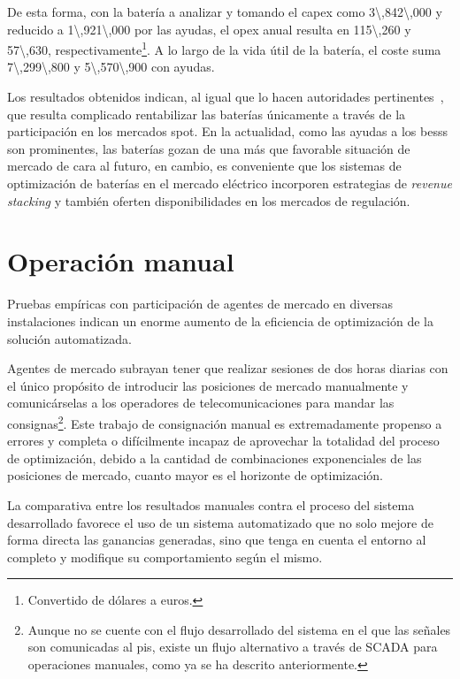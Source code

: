 De esta forma, con la batería a analizar y tomando el \gls{capex} como \SI{3\,842\,000}{\text{\euro}} y reducido a \SI{1\,921\,000}{\text{\euro}} por las ayudas, el \gls{opex} anual resulta en \SI{115\,260}{\text{\euro}} y \SI{57\,630}{\text{\euro}}, respectivamente\footnote{Convertido de dólares a euros.}. A lo largo de la vida útil de la batería, el coste suma \SI{7\,299\,800}{\text{\euro}} y \SI{5\,570\,900}{\text{\euro}} con ayudas.

Los resultados obtenidos indican, al igual que lo hacen autoridades pertinentes~\cite{gadvisory2025technical}, que resulta complicado rentabilizar las baterías únicamente a través de la participación en los mercados spot. En la actualidad, como las ayudas a los \glspl{bess} son prominentes, las baterías gozan de una más que favorable situación de mercado de cara al futuro, en cambio, es conveniente que los sistemas de optimización de baterías en el mercado eléctrico incorporen estrategias de \textit{revenue stacking} y también oferten disponibilidades en los mercados de regulación.

\section{Operación manual}%
\label{makereference7.2}

Pruebas empíricas con participación de agentes de mercado en diversas instalaciones indican un enorme aumento de la eficiencia de optimización de la solución automatizada.

Agentes de mercado subrayan tener que realizar sesiones de dos horas diarias con el único propósito de introducir las posiciones de mercado manualmente y comunicárselas a los operadores de telecomunicaciones para mandar las consignas\footnote{Aunque no se cuente con el flujo desarrollado del sistema en el que las señales son comunicadas al \gls{pis}, existe un flujo alternativo a través de SCADA para operaciones manuales, como ya se ha descrito anteriormente.}. Este trabajo de consignación manual es extremadamente propenso a errores y completa o difícilmente incapaz de aprovechar la totalidad del proceso de optimización, debido a la cantidad de combinaciones exponenciales de las posiciones de mercado, cuanto mayor es el horizonte de optimización.

La comparativa entre los resultados manuales contra el proceso del sistema desarrollado favorece el uso de un sistema automatizado que no solo mejore de forma directa las ganancias generadas, sino que tenga en cuenta el entorno al completo y modifique su comportamiento según el mismo.

